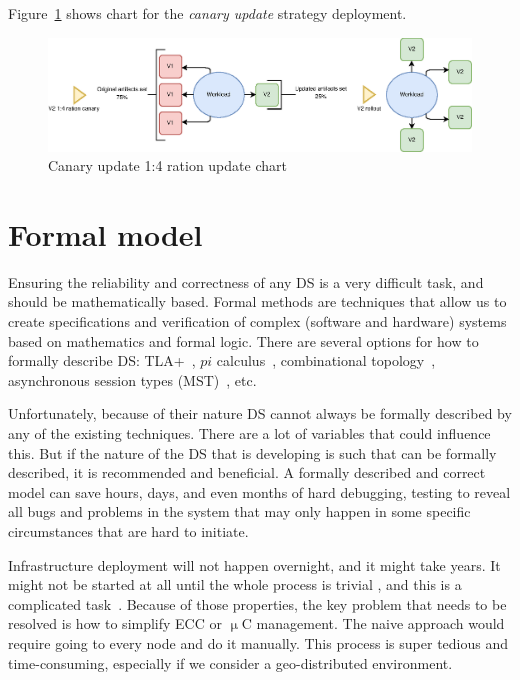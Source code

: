 Figure~\ref{fig:fig28} shows chart for the \emph{canary update} strategy deployment.

\begin{figure}[H]
	\begin{center}
		\includegraphics[width=\columnwidth]{images/Figure28}
	\end{center}
	\vspace{-0.5cm}
	\caption{Canary update 1:4 ration update chart}
	\label{fig:fig28}
\end{figure}

%
%
\section{Formal model}\label{sec:formal_model}
%
Ensuring the reliability and correctness of any DS is a very difficult task, and should be mathematically based. Formal methods are techniques that allow us to create specifications and verification of complex (software and hardware) systems based on mathematics and formal logic. There are several options for how to formally describe DS: TLA+~\cite{YuML99}, $pi$ calculus~\cite{0018113}, combinational topology~\cite{Upadhyay16}, asynchronous session types (MST)~\cite{HondaYC08}, etc. 

Unfortunately, because of their nature DS cannot always be formally described by any of the existing techniques. There are a lot of variables that could influence this. But if the nature of the DS that is developing is such that can be formally described, it is recommended and beneficial. A formally described and correct model can save hours, days, and even months of hard debugging, testing to reveal all bugs and problems in the system that may only happen in some specific circumstances that are hard to initiate.

Infrastructure deployment will not happen overnight, and it might take years. It might not be started at all until the whole process is trivial \cite{SatyanarayananBCD09}, and this is a complicated task~\cite{JararwehDAAAB16}. Because of those properties, the key problem that needs to be resolved is how to simplify ECC or $\upmu$C management. The naive approach would require going to every node and do it manually. This process is super tedious and time-consuming, especially if we consider a geo-distributed environment. 

